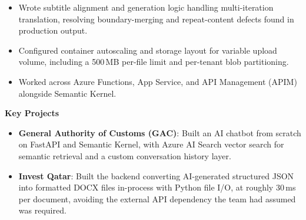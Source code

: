 \documentclass[10pt,a4paper]{article}
\begin{document}
\begin{itemize}
    poison-message routing, bounded retry with backoff on the translation
    lifecycle, and per-action state logging for observability.
    \item Wrote subtitle alignment and generation logic handling multi-iteration
    translation, resolving boundary-merging and repeat-content defects found in
    production output.
    \item Configured container autoscaling and storage layout for variable
    upload volume, including a 500\,MB per-file limit and per-tenant blob
    partitioning.
    \item Worked across Azure Functions, App Service, and API Management (APIM)
    alongside Semantic Kernel.
\end{itemize}

\vspace{2pt}
\textbf{Key Projects}
\begin{itemize}
    \item \textbf{General Authority of Customs (GAC)}: Built an AI chatbot from
    scratch on FastAPI and Semantic Kernel, with Azure AI Search vector search
    for semantic retrieval and a custom conversation history layer.
    \item \textbf{Invest Qatar}: Built the backend converting AI-generated
    structured JSON into formatted DOCX files in-process with Python file I/O,
    at roughly 30\,ms per document, avoiding the external API dependency the team
    had assumed was required.
\end{itemize}
\end{document}
